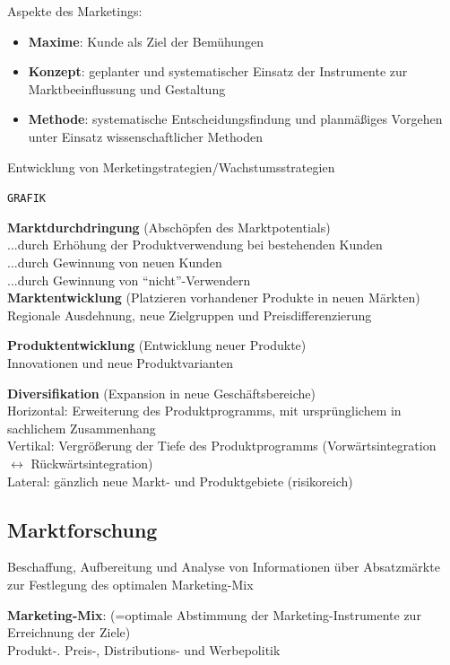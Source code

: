 \documentclass[a4paper,11pt, twoside]{article}
\newcommand\mpar[1]{\marginpar {\flushleft\small #1}}
\begin{document}
Aspekte des Marketings:
\begin{itemize}
	\item \textbf{Maxime}: Kunde als Ziel der Bemühungen
	\item  \textbf{Konzept}: geplanter und systematischer Einsatz der Instrumente zur Marktbeeinflussung und Gestaltung
	\item \textbf{Methode}: systematische Entscheidungsfindung und planmäßiges Vorgehen unter Einsatz wissenschaftlicher Methoden
\end{itemize}

Entwicklung von Merketingstrategien/Wachstumsstrategien 

\texttt{GRAFIK}

\textbf{Marktdurchdringung} (Abschöpfen des Marktpotentials)\\
...durch Erhöhung der Produktverwendung bei bestehenden Kunden\\
...durch Gewinnung von neuen Kunden\\
...durch Gewinnung von "`nicht"'-Verwendern\\

\textbf{Marktentwicklung} (Platzieren vorhandener Produkte in neuen Märkten)\\
Regionale Ausdehnung, neue Zielgruppen und Preisdifferenzierung

\textbf{Produktentwicklung} (Entwicklung neuer Produkte)\\
Innovationen und neue Produktvarianten

\mpar{\textcolor{red}{risikoreichste Wachstumstrategie}}

\textbf{Diversifikation} (Expansion in neue Geschäftsbereiche)\\
Horizontal: Erweiterung des Produktprogramms, mit ursprünglichem in sachlichem Zusammenhang\\
Vertikal: Vergrößerung der Tiefe des Produktprogramms (Vorwärtsintegration $\leftrightarrow$ Rückwärtsintegration)\\
Lateral: gänzlich neue Markt- und Produktgebiete (risikoreich)\\

\subsection{Marktforschung}
Beschaffung, Aufbereitung und Analyse von Informationen über Absatzmärkte zur Festlegung des optimalen Marketing-Mix

\textbf{Marketing-Mix}: (=optimale Abstimmung der Marketing-Instrumente zur Erreichnung der Ziele)\\
Produkt-. Preis-, Distributions- und Werbepolitik
\end{document}
